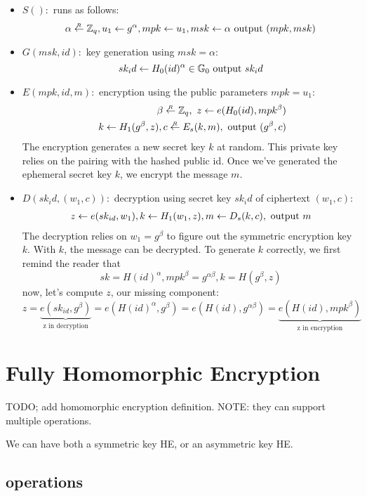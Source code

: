 \begin{itemize}
  \item $S():$ runs as follows:
  $$ \alpha\overset{_R}{\leftarrow} \mathbb{Z}_q, u_1\leftarrow g^\alpha, mpk \leftarrow u_1, msk \leftarrow \alpha 
  \text{ output }(mpk,msk) $$
  \item $G(msk,id):$ key generation using $msk = \alpha$:
  $$ sk_id \leftarrow H_0(id)^\alpha \in \mathbb{G}_0 \text{ output } sk_id$$
  \item $E(mpk, id, m ):$ encryption using the public parameters $mpk=u_1$:
  \begin{align*}\label{lamlam} 
    \beta \getrandom \Z_q,\  z\from e(H_0(id),mpk^\beta) 
    \\ \ 
    k\from H_1(g^\beta,z), c\getrandom E_s(k,m), \text{ output } (g^\beta,c)
  \end{align*}
  The encryption generates a new secret key $k$ at random. This private key relies on the pairing with
  the hashed public id. Once we've generated the ephemeral secret key $k$, we encrypt the message $m$.

  \item $D(sk_id,(w_1,c)):$ decryption using secret key $sk_id$ of ciphertext $(w_1,c)$:
  \begin{align*}
    z \leftarrow  e(sk_{id},w_1), k\leftarrow H_1(w_1, z), m\leftarrow D_s(k,c),
  \text{ output } m
  \end{align*}
  The decryption relies on $w_1=g^\beta$ to figure out the symmetric encryption key $k$.
  With $k$, the message can be decrypted.
  \newline
  To generate $k$ correctly, we first remind the reader that $$sk=H(id)^\alpha, mpk^\beta=g^{\alpha\beta}, k=H(g^\beta,z)$$
  now, let's compute $z$, our missing component:
  $$
  z=\underbrace{e(sk_{id},g^\beta)}_{\text{z in decryption}}=e(H(id)^\alpha,g^\beta)=e(H(id),g^{\alpha\beta})=\underbrace{e(H(id),mpk^\beta)}_{\text{z in encryption}}
  $$
\end{itemize}



\chapter{Fully Homomorphic Encryption}

TODO; add homomorphic encryption definition. NOTE: they can support
multiple operations.

We can have both a symmetric key HE, or an asymmetric key HE. 

\section{operations}

